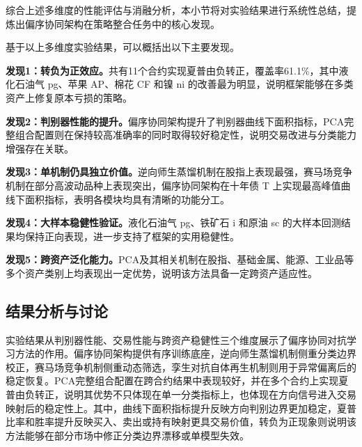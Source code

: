 % 

综合上述多维度的性能评估与消融分析，本小节将对实验结果进行系统性总结，提炼出偏序协同架构在策略整合任务中的核心发现。

基于以上多维度实验结果，可以概括出以下主要发现。

% 


\textbf{发现1：转负为正效应。}共有11个合约实现夏普由负转正，覆盖率61.1\%，其中液化石油气 pg、苹果 AP、棉花 CF 和镍 ni 的改善最为明显，说明框架能够在多类资产上修复原本亏损的策略。

\textbf{发现2：判别器性能的提升。}偏序协同架构提升了判别器曲线下面积指标，PCA完整组合配置则在保持较高准确率的同时取得较好稳定性，说明交易改进与分类能力增强存在关联。

\textbf{发现3：单机制仍具独立价值。}逆向师生蒸馏机制在股指上表现最强，赛马场竞争机制在部分高波动品种上表现突出，偏序协同架构在十年债 T 上实现最高峰值曲线下面积指标，表明各模块均具有清晰的功能分工。

\textbf{发现4：大样本稳健性验证。}液化石油气 pg、铁矿石 i 和原油 sc 的大样本回测结果均保持正向表现，进一步支持了框架的实用稳健性。

\textbf{发现5：跨资产泛化能力。}PCA及其相关机制在股指、基础金属、能源、工业品等多个资产类别上均表现出一定优势，说明该方法具备一定跨资产适应性。

\subsection{结果分析与讨论}

实验结果从判别器性能、交易性能与跨资产稳健性三个维度展示了偏序协同对抗学习方法的作用。偏序协同架构提供有序训练底座，逆向师生蒸馏机制侧重分类边界校正，赛马场竞争机制侧重动态筛选，孪生对抗自体再生机制则用于异常偏离后的稳定恢复。PCA完整组合配置在跨合约结果中表现较好，并在多个合约上实现夏普由负转正，说明其优势不只体现在单一分类指标上，也体现在方向信号进入交易映射后的稳定性上。其中，曲线下面积指标提升反映方向判别边界更加稳定，夏普比率和胜率提升反映买入、卖出或持有映射更具交易价值，转负为正现象则说明该方法能够在部分市场中修正分类边界漂移或单模型失效。

